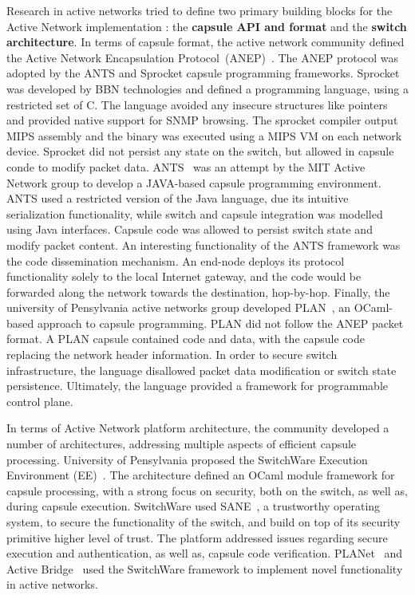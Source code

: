 Research in active networks tried to define two primary building blocks for the
Active Network implementation : the {\bf capsule API and format} and the {\bf
  switch architecture}. In terms of capsule format, the active network community
defined the Active Network Encapsulation Protocol~(ANEP)~\cite{alexander1997a}.
The ANEP protocol was adopted by the ANTS and Sprocket capsule programming
frameworks.  Sprocket~\cite{Schwartz2000} was developed by BBN technologies and
defined a programming language, using a restricted set of C.
The language avoided any insecure structures like pointers and provided
native support for SNMP browsing. The sprocket compiler output MIPS
assembly and the binary was executed using a MIPS VM on each network device.
Sprocket did not persist any state on the switch, but allowed in capsule conde 
to modify packet data. ANTS~\cite{Wetherall1998} was an attempt
by the MIT Active Network group to develop a JAVA-based capsule programming
environment.  ANTS used a restricted version of the Java language, due its
intuitive serialization functionality, while switch and capsule integration was modelled using 
Java interfaces. Capsule code was allowed to persist switch state
and modify packet content. An interesting functionality of the ANTS
framework was the code dissemination mechanism. An end-node deploys its protocol
functionality solely to the local Internet gateway, and the code would be forwarded
along the network towards the destination, hop-by-hop. Finally, the university of Pensylvania
active networks group developed PLAN~\cite{Hicks1998}, an OCaml-based approach
to capsule programming.  PLAN did not follow the ANEP packet format. A PLAN
capsule contained code and data, with the capsule code replacing the network header
information. In order to secure switch infrastructure, the language disallowed
packet data modification or switch state persistence.  Ultimately, the language
provided a framework for programmable control plane.

In terms of Active Network platform architecture, the community developed a
number of architectures, addressing multiple aspects of efficient capsule
processing. University of Pensylvania proposed the SwitchWare Execution
Environment (EE)~\cite{Alexander1998}.  The architecture defined an OCaml module
framework for capsule processing, with a strong focus on 
security, both on the switch, as well
as, during capsule execution.  SwitchWare used SANE~\cite{Alexander1998b}, a
trustworthy operating system, to secure the functionality of the switch, and
build on top of its security primitive higher level of trust. The platform
addressed issues regarding secure execution and authentication, as well as,
capsule code verification.  PLANet~\cite{Hicks1999} and Active
Bridge~\cite{Alexander1997b} used the SwitchWare framework to implement novel
functionality in active networks. 

